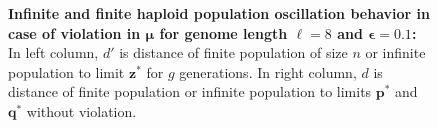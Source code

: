 \begin{figure}[h]
\begin{center}
\hspace{-3em}%
\vspace{-0.5em} \hspace{-3em}%


\caption[\textbf{Infinite and finite haploid population oscillation behavior in case of violation in $\bm{\mu}$ for genome length $\ell = 8$ and $\bm{\epsilon} = 0.1$}]{\textbf{Infinite and finite haploid population oscillation behavior in case of violation in $\bm{\mu}$ for genome length $\ell = 8$ and $\bm{\epsilon} = 0.1$:} 
  In left column, $d'$ is distance of finite population of size $n$ or infinite population to limit $\bm{z}^\ast$ for $g$ generations. In right column, $d$ is distance of finite population or infinite population to limits $\bm{p}^\ast$ and $\bm{q}^\ast$ without violation.}
\label{oscillation_8h_vio_mu_0.1}
\end{center}
\end{figure}

